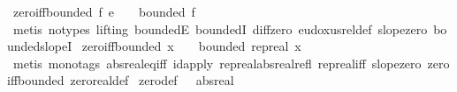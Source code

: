 \begin{isabellebody}
\isanewline
{}\isamarkupfalse%
\ zero{\isacharunderscore}{\kern0pt}iff{\isacharunderscore}{\kern0pt}bounded{\isacharcolon}{\kern0pt}\ {\isachardoublequoteopen}f\ {\isasymsim}\isactrlsub e\ {\isacharparenleft}{\kern0pt}{\isasymlambda}{\isacharunderscore}{\kern0pt}{\isachardot}{\kern0pt}\ {}{\isacharparenright}{\kern0pt}\ {\isasymlongleftrightarrow}\ bounded\ f{\isachardoublequoteclose}%
\isadelimproof
\ %
\endisadelimproof
%
\isatagproof
{}\isamarkupfalse%
\ {\isacharparenleft}{\kern0pt}metis\ {\isacharparenleft}{\kern0pt}no{\isacharunderscore}{\kern0pt}types{\isacharcomma}{\kern0pt}\ lifting{\isacharparenright}{\kern0pt}\ boundedE\ boundedI\ diff{\isacharunderscore}{\kern0pt}zero\ eudoxus{\isacharunderscore}{\kern0pt}rel{\isacharunderscore}{\kern0pt}def\ slope{\isacharunderscore}{\kern0pt}zero\ bounded{\isacharunderscore}{\kern0pt}slopeI{\isacharparenright}{\kern0pt}%
\endisatagproof
{\isafoldproof}%
%
\isadelimproof
%
\endisadelimproof
\isanewline
{}\isamarkupfalse%
\ zero{\isacharunderscore}{\kern0pt}iff{\isacharunderscore}{\kern0pt}bounded{\isacharprime}{\kern0pt}{\isacharcolon}{\kern0pt}\ {\isachardoublequoteopen}x\ {\isacharequal}{\kern0pt}\ {}\ {\isasymlongleftrightarrow}\ bounded\ {\isacharparenleft}{\kern0pt}rep{\isacharunderscore}{\kern0pt}real\ x{\isacharparenright}{\kern0pt}{\isachardoublequoteclose}%
\isadelimproof
\ %
\endisadelimproof
%
\isatagproof
{}\isamarkupfalse%
\ {\isacharparenleft}{\kern0pt}metis\ {\isacharparenleft}{\kern0pt}mono{\isacharunderscore}{\kern0pt}tags{\isacharparenright}{\kern0pt}\ abs{\isacharunderscore}{\kern0pt}real{\isacharunderscore}{\kern0pt}eq{\isacharunderscore}{\kern0pt}iff\ id{\isacharunderscore}{\kern0pt}apply\ rep{\isacharunderscore}{\kern0pt}real{\isacharunderscore}{\kern0pt}abs{\isacharunderscore}{\kern0pt}real{\isacharunderscore}{\kern0pt}refl\ rep{\isacharunderscore}{\kern0pt}real{\isacharunderscore}{\kern0pt}iff\ slope{\isacharunderscore}{\kern0pt}zero\ zero{\isacharunderscore}{\kern0pt}iff{\isacharunderscore}{\kern0pt}bounded\ zero{\isacharunderscore}{\kern0pt}real{\isacharunderscore}{\kern0pt}def{\isacharparenright}{\kern0pt}%
\endisatagproof
{\isafoldproof}%
%
\isadelimproof
%
\endisadelimproof
\isanewline
\isanewline
{}\isamarkupfalse%
\ zero{\isacharunderscore}{\kern0pt}def{\isacharcolon}{\kern0pt}\ {\isachardoublequoteopen}{}\ {\isacharequal}{\kern0pt}\ abs{\isacharunderscore}{\kern0pt}real\ {\isacharparenleft}{\kern0pt}{\isasymlambda}{\isacharunderscore}{\kern0pt}{\isachardot}{\kern0pt}\ {}{\isacharparenright}{\kern0pt}{\isachardoublequoteclose}%

\end{isabellebody}
